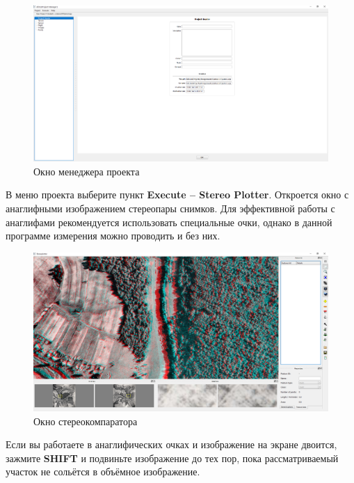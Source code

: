 \documentclass[
  12pt,
]{book}
\begin{document}
\begin{figure}
\centering
\includegraphics{images/stereo/Project_Manager.png}
\caption{Окно менеджера проекта}
\end{figure}

В меню проекта выберите пункт \textbf{Execute -- Stereo Plotter}. Откроется окно с анаглифными изображением стереопары снимков. Для эффективной работы с анаглифами рекомендуется использовать специальные очки, однако в данной программе измерения можно проводить и без них.

\begin{figure}
\centering
\includegraphics{images/stereo/Stereoplotter.png}
\caption{Окно стереокомпаратора}
\end{figure}

Если вы работаете в анаглифических очках и изображение на экране двоится, зажмите \textbf{SHIFT} и подвиньте изображение до тех пор, пока рассматриваемый участок не сольётся в объёмное изображение.
\end{document}
